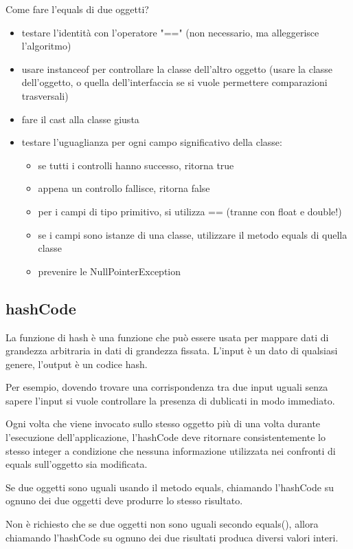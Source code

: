 \documentclass[a4paper,12pt,twoside]{book}
\begin{document}
Come fare l'equals di due oggetti?
\begin{itemize}
\item testare l’identità con l’operatore "==" (non necessario, ma
  alleggerisce l’algoritmo)
\item usare instanceof per controllare la classe dell’altro oggetto
  (usare la classe dell’oggetto, o quella dell’interfaccia se si vuole
  permettere comparazioni trasversali)
\item fare il cast alla classe giusta
\item testare l’uguaglianza per ogni campo significativo
  della classe:
  \begin{itemize}
  \item se tutti i controlli hanno successo, ritorna true
  \item appena un controllo fallisce, ritorna false
  \item per i campi di tipo primitivo, si utilizza == (tranne con float e
    double!)
  \item se i campi sono istanze di una classe, utilizzare il metodo
    equals di quella classe
  \item prevenire le NullPointerException
  \end{itemize}
\end{itemize}
\subsection{hashCode}
La funzione di hash è una funzione che può essere usata per mappare
dati di grandezza arbitraria in dati di grandezza fissata. L'input è
un dato di qualsiasi genere, l'output è un codice hash.

Per esempio, dovendo trovare una corrispondenza tra due input uguali
senza sapere l'input si vuole controllare la presenza di dublicati in
modo immediato.


Ogni volta che viene invocato sullo stesso oggetto più di una volta
durante l'esecuzione dell'applicazione, l'hashCode deve ritornare
consistentemente lo stesso integer a condizione che nessuna
informazione utilizzata nei confronti di equals sull'oggetto sia
modificata.

Se due oggetti sono uguali usando il metodo equals, chiamando
l'hashCode su ognuno dei due oggetti deve produrre lo stesso
risultato.

Non è richiesto che se due oggetti non sono uguali secondo equals(),
allora chiamando l'hashCode su ognuno dei due risultati produca
diversi valori interi.
\end{document}
